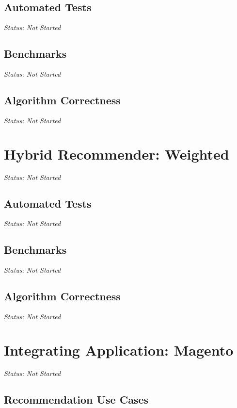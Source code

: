 \subsection{Automated Tests}

\emph{Status: Not Started}

\subsection{Benchmarks}

\emph{Status: Not Started}

\subsection{Algorithm Correctness}

\emph{Status: Not Started}

\section{Hybrid Recommender: Weighted}

\emph{Status: Not Started}

\subsection{Automated Tests}

\emph{Status: Not Started}

\subsection{Benchmarks}

\emph{Status: Not Started}

\subsection{Algorithm Correctness}

\emph{Status: Not Started}

\section{Integrating Application: Magento}

\emph{Status: Not Started}

\subsection{Recommendation Use Cases}

